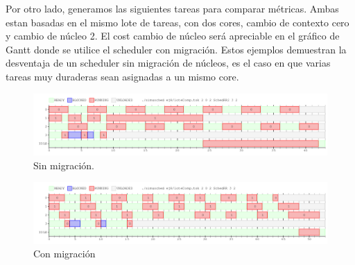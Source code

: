 Por otro lado, generamos las siguientes tareas para comparar métricas. Ambas estan basadas en el mismo lote de tareas, con dos cores, cambio de contexto cero y cambio de núcleo 2. El cost cambio de núcleo será apreciable en el gráfico de Gantt donde se utilice el scheduler con migración.
Estos ejemplos demuestran la desventaja de un scheduler sin migración de núcleos, es el caso en que varias tareas muy duraderas sean asignadas a un mismo core.


\begin{figure}[h]
  \includegraphics[width=\textwidth]{../ej8/comp1.png}
  \caption{Sin migración.}
\end{figure}

\begin{figure}[h]
  \includegraphics[width=\textwidth]{../ej8/comp2.png}
  \caption{Con migración}
\end{figure}





